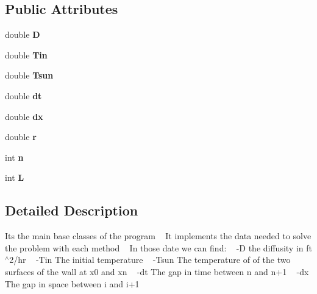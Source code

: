 \subsection*{Public Attributes}
\begin{DoxyCompactItemize}
\item 
\mbox{\label{class_solve_ab6b73352e9bca73bad1b133fc84f008c}} 
double {\bfseries D}
\item 
\mbox{\label{class_solve_a324c747af91a26a206d7772853b8655e}} 
double {\bfseries Tin}
\item 
\mbox{\label{class_solve_a7145536b49fb1ac4d2f36f800d118616}} 
double {\bfseries Tsun}
\item 
\mbox{\label{class_solve_ac1befb9c006f895fb0517e19c412ca57}} 
double {\bfseries dt}
\item 
\mbox{\label{class_solve_a21b9b8118f508e079f066d2ce2816dd1}} 
double {\bfseries dx}
\item 
\mbox{\label{class_solve_a8007aa7266c3ba3207ce233d54d720d7}} 
double {\bfseries r}
\item 
\mbox{\label{class_solve_acc2a34441a699bf1e68f730a1bbe7774}} 
int {\bfseries n}
\item 
\mbox{\label{class_solve_a95de020d455d886e667b8307d7efed55}} 
int {\bfseries L}
\end{DoxyCompactItemize}


\subsection{Detailed Description}
It\textquotesingle{}s the main base classes of the program ~\newline
 It implements the data needed to solve the problem with each method ~\newline
 In those date we can find\+: ~\newline
-\/D the diffusity in ft$^\wedge$2/hr ~\newline
-\/\+Tin The initial temperature ~\newline
-\/\+Tsun The temperature of of the two surfaces of the wall at x0 and xn ~\newline
-\/dt The gap in time between n and n+1 ~\newline
-\/dx The gap in space between i and i+1

